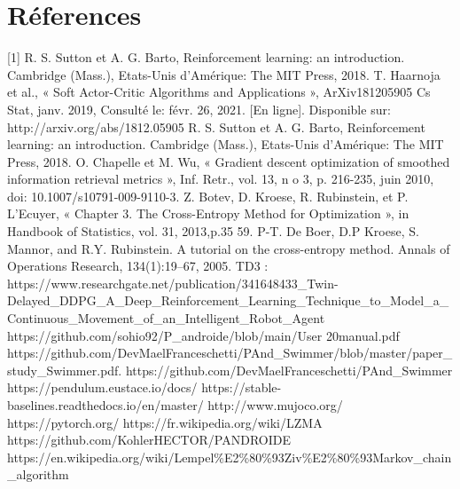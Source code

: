 \documentclass[12pt]{article}
\begin{document}
\section{Réferences} \label{second}
[1] R. S. Sutton et A. G. Barto, Reinforcement learning: an introduction. Cambridge (Mass.),
Etats-Unis d’Amérique: The MIT Press, 2018. \label{[1]} \newline
[2] T. Haarnoja et al., « Soft Actor-Critic Algorithms and Applications », ArXiv181205905 Cs
Stat, janv. 2019, Consulté le: févr. 26, 2021. [En ligne]. Disponible sur:
http://arxiv.org/abs/1812.05905   \label{[2]} \newline
[3] R. S. Sutton et A. G. Barto, Reinforcement learning: an introduction. Cambridge (Mass.),
Etats-Unis d’Amérique: The MIT Press, 2018.\label{[3]} \newline
[4] O. Chapelle et M. Wu, « Gradient descent optimization of smoothed information retrieval
metrics », Inf. Retr., vol. 13, n
o 3, p. 216-235, juin 2010, doi: 10.1007/s10791-009-9110-3.\label{[4]} \newline
[5] Z. Botev, D. Kroese, R. Rubinstein, et P. L’Ecuyer, « Chapter 3. The Cross-Entropy
Method for Optimization », in Handbook of Statistics, vol. 31, 2013,p.35 59. \label{[5]} \newline
[6] P-T. De Boer, D.P Kroese, S. Mannor, and R.Y. Rubinstein. A tutorial on the cross-entropy method. Annals of Operations Research, 134(1):19–67, 2005.\label{[6]} \newline
[7] TD3 : https://www.researchgate.net/publication/341648433\_Twin-Delayed\_DDPG\_A\_Deep\_Reinforcement\_Learning\_Technique\_to\_Model\_a\_Continuous\_Movement\_of\_an\_Intelligent\_Robot\_Agent \label{[7]} \newline
[8] https://github.com/sohio92/P\_androide/blob/main/User 20manual.pdf \label{[8]} \newline
[9] https://github.com/DevMaelFranceschetti/PAnd\_Swimmer/blob/master/paper\_study\_Swimmer.pdf. \label{[9]} \newline
[10] https://github.com/DevMaelFranceschetti/PAnd\_Swimmer \label{[10]}\newline
[11] https://pendulum.eustace.io/docs/ \label{[11]}\newline
[12] https://stable-baselines.readthedocs.io/en/master/  \label{[12]}\newline
[13] http://www.mujoco.org/ \label{[13]}\newline
[14] https://pytorch.org/  \label {[14]}\newline
[15] https://fr.wikipedia.org/wiki/LZMA \label{[15]}\newline
[17] https://github.com/KohlerHECTOR/PANDROIDE \label{[17]}\newline 
[16] https://en.wikipedia.org/wiki/Lempel\%E2\%80\%93Ziv\%E2\%80\%93Markov\_chain\_algorithm \label{[16]} \newline
\end{document}
